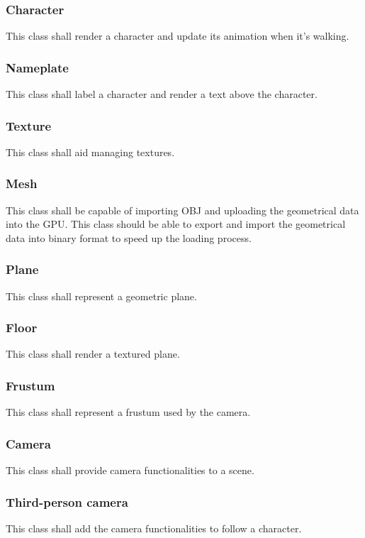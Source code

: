 \documentclass[12pt]{article}
\begin{document}
	\subsubsection{Character}
	This class shall render a character and update its animation when it's walking.
	
	\subsubsection{Nameplate}
	This class shall label a character and render a text above the character.
	
	\subsubsection{Texture}
	This class shall aid managing textures.
	
	\subsubsection{Mesh}
	This class shall be capable of importing OBJ and uploading the geometrical data into the GPU. This class should be able to export and import the geometrical data into binary format to speed up the loading process.
	
	\subsubsection{Plane}
	This class shall represent a geometric plane.
	
	\subsubsection{Floor}
	This class shall render a textured plane.
	
	\subsubsection{Frustum}
	This class shall represent a frustum used by the camera.
	
	\subsubsection{Camera}
	This class shall provide camera functionalities to a scene.
	
	\subsubsection{Third-person camera}
	This class shall add the camera functionalities to follow a character.
	
\end{document}
